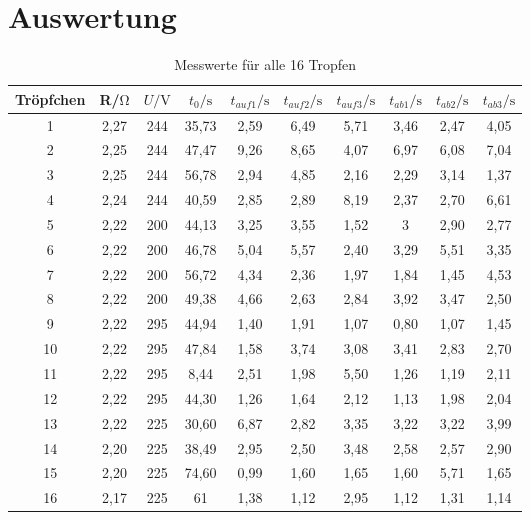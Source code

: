 \section{Auswertung}
\label{sec:Auswertung}
\begin{table}[H]
    \centering
    \caption{Messwerte für alle 16 Tropfen}
    \label{tab:Messwerte}
    \begin{tabular}{S[table-format=2] S[table-format=1.2] S[table-format=3] S[table-format=2.2]S[table-format=1.2]S[table-format=1.2]S[table-format=1.2]S[table-format=1.2]S[table-format=1.2]S[table-format=1.2]}
        \toprule
        {Tröpfchen}&{R/$\unit{\ohm}$}&{$U/\unit{\volt}$}&{$t_0/\unit{\s}$}&{$t_{auf1}/\unit{\s}$}&{$t_{auf2}/\unit{\s}$}&{$t_{auf3}/\unit{\s}$}&{$t_{ab1}/\unit{\s}$}&{$t_{ab2}/\unit{\s}$}&{$t_{ab3}/\unit{\s}$}\\
         & 2,27 & 244 & 35,73 & 2,59 & 6,49 & 5,71 & 3,46 & 2,47 & 4,05 \\
        2 & 2,25 & 244 & 47,47 & 9,26 & 8,65 & 4,07 & 6,97 & 6,08 & 7,04 \\
        3 & 2,25 & 244 & 56,78 & 2,94 & 4,85 & 2,16 & 2,29 & 3,14 & 1,37 \\
        4 & 2,24 & 244 & 40,59 & 2,85 & 2,89 & 8,19 & 2,37 & 2,70 & 6,61 \\
        5 & 2,22 & 200 & 44,13 & 3,25 & 3,55 & 1,52 & 3 & 2,90 & 2,77 \\
        6 & 2,22 & 200 & 46,78 & 5,04 & 5,57 & 2,40 & 3,29 & 5,51 & 3,35 \\
        7 & 2,22 & 200 & 56,72 & 4,34 & 2,36 & 1,97 & 1,84 & 1,45 & 4,53 \\
        8 & 2,22 & 200 & 49,38 & 4,66 & 2,63 & 2,84 & 3,92 & 3,47 & 2,50 \\
        9 & 2,22 & 295 & 44,94 & 1,40 & 1,91 & 1,07 & 0,80 & 1,07 & 1,45 \\
        10 & 2,22 & 295 & 47,84 & 1,58 & 3,74 & 3,08 & 3,41 & 2,83 & 2,70 \\
        11 & 2,22 & 295 & 8,44 & 2,51 & 1,98 & 5,50 & 1,26 & 1,19 & 2,11 \\
        12 & 2,22 & 295 & 44,30 & 1,26 & 1,64 & 2,12 & 1,13 & 1,98 & 2,04 \\
        13 & 2,22 & 225 & 30,60 & 6,87 & 2,82 & 3,35 & 3,22 & 3,22 & 3,99 \\
        14 & 2,20 & 225 & 38,49 & 2,95 & 2,50 & 3,48 & 2,58 & 2,57 & 2,90 \\
        15 & 2,20 & 225 & 74,60 & 0,99 & 1,60 & 1,65 & 1,60 & 5,71 & 1,65 \\
        16 & 2,17 & 225 & 61 & 1,38 & 1,12 & 2,95 & 1,12 & 1,31 & 1,14 \\
        \bottomrule
    \end{tabular}
  \end{table}

